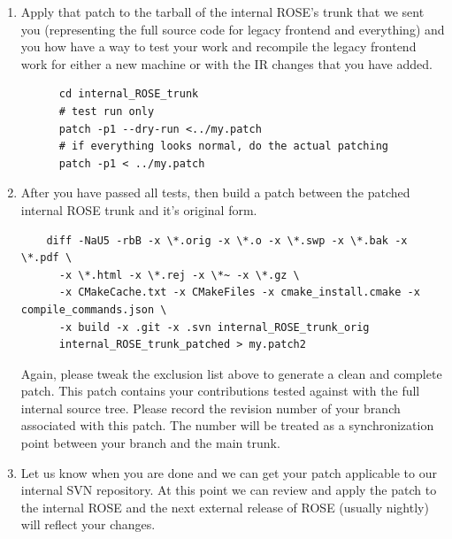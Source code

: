 \begin{enumerate}
   A typical  command to generate a patch looks like the following:
    \begin{verbatim}
    diff -NaU5 -rbB -x \*.orig -x \*.o -x \*.swp -x \*.bak -x \*.pdf \
      -x \*.html -x \*.rej -x \*~ -x \*.gz \
      -x CMakeCache.txt -x CMakeFiles -x cmake_install.cmake -x compile_commands.json \
      -x build -x .git -x .svn external_trunk your_updated_branch > my.patch
    \end{verbatim}
    You may need to check the generated patch and add or remove the items
    in the exclusion list to regenerate a desired patch as needed.
    The final patch should only contains your contributions.
   \item Apply that patch to the tarball of the internal ROSE's trunk that we sent you (representing
     the full source code for legacy frontend and everything) and you how have a way to test
     your work and recompile the legacy frontend work for either a new machine or with the IR changes
     that you have added.
     \begin{verbatim}
      cd internal_ROSE_trunk
      # test run only
      patch -p1 --dry-run <../my.patch
      # if everything looks normal, do the actual patching
      patch -p1 < ../my.patch
     \end{verbatim}
   \item After you have passed all tests, then build a patch between the
   patched internal ROSE trunk and it's original form. 
    \begin{verbatim}
    diff -NaU5 -rbB -x \*.orig -x \*.o -x \*.swp -x \*.bak -x \*.pdf \
      -x \*.html -x \*.rej -x \*~ -x \*.gz \
      -x CMakeCache.txt -x CMakeFiles -x cmake_install.cmake -x compile_commands.json \
      -x build -x .git -x .svn internal_ROSE_trunk_orig
      internal_ROSE_trunk_patched > my.patch2
    \end{verbatim}
    Again, please tweak the exclusion list above to generate a clean and
    complete patch. This patch contains your contributions tested against
    with the full internal source tree. Please record the revision number
    of your branch associated with this patch. The number will be treated
    as a synchronization point between your branch and the main trunk. 
   \item Let us know when you are done and we can get your patch applicable to
   our internal SVN repository. At this point we can review and apply the
   patch to the internal ROSE and
    the next external release of ROSE (usually nightly) will reflect your changes.
\end{enumerate}

